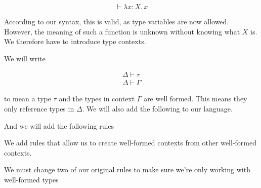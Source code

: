 \documentclass{lecturenotes}
\newcommand{\tabs}[3]{\ensuremath{\lambda #1 \colon #2.\,#3}}
\newcommand{\utype}{\textsf{unit}\xspace}
\newcommand{\unit}{\ensuremath{\textsf{(}\mkern0.5mu\textsf{)}}}
\newcommand{\prodtype}[2]{\ensuremath{#1 \times #2}}
\newcommand{\sumtype}[2]{\ensuremath{#1 + #2}}
\newcommand{\rectype}[2]{\ensuremath{\mu #1.\,#2}}
\begin{document}
\[
  \vdash \tabs{x}{X}{x}
\]

According to our syntax, this is valid, as type variables are now allowed.
However, the meaning of such a function is unknown without knowing what $X$ is.
We therefore have to introduce type contexts.

We will write

\begin{gather*}
  \Delta \vdash \tau\\
  \Delta \vdash \Gamma
\end{gather*}

to mean a type $\tau$ and the types in context $\Gamma$ are well formed.
This means they only reference types in $\Delta$.
We will also add the following to our language.

\begin{syntax}
   \alternative{\cdot} 
\end{syntax}

And we will add the following rules


We add rules that allow us to create well-formed contexts from other well-formed contexts.

We must change two of our original rules to make sure we're only working with well-formed types
\end{document}
